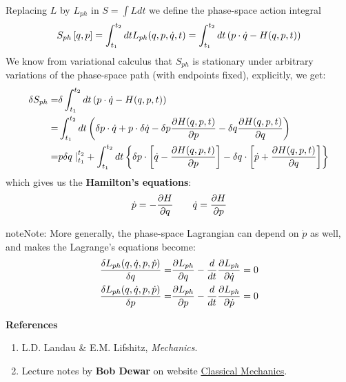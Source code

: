 \documentclass[letterpaper,10pt,english]{sphinxmanual}
\begin{document}
Replacing \(L\) by \(L_{ph}\) in \(S =
\int L dt\) we define the phase-space action integral
\begin{gather}
\begin{split}S_{ph}\left[q, p\right] = \int_{t_1}^{t_2}dt L_{ph}(q,p,\dot{q},t)=\int_{t_1}^{t_2}dt \left(p\cdot\dot{q}-H(q,p,t)\right)\end{split}\notag
\end{gather}
We know from variational calculus that \(S_{ph}\) is stationary under arbitrary
variations of the phase-space path (with endpoints fixed), explicitly, we get:
\begin{gather}
\begin{split}\delta S_{ph} =&\delta\int_{t_1}^{t_2}dt \left(p\cdot\dot{q}-H(q,p,t)\right) \\
=&\int_{t_1}^{t_2}dt \left(\delta p\cdot\dot{q}+p\cdot\delta\dot{q}-\delta p \frac{\partial H(q,p,t)}{\partial p}-\delta q \frac{\partial H(q,p,t)}{\partial q}\right) \\
=&p\delta q\left. \right |_{t_1}^{t_2}+\int_{t_1}^{t_2}dt \left\{\delta p\cdot\left[\dot{q}-\frac{\partial H(q,p,t)}{\partial p}\right]-\delta q\cdot\left[\dot{p}+ \frac{\partial H(q,p,t)}{\partial q}\right]\right\}\end{split}\notag
\end{gather}
which gives us the \textbf{Hamilton's equations}:
\begin{gather}
\begin{split}\dot{p}=-\frac{\partial H}{\partial q} \qquad \dot{q}=\frac{\partial H}{\partial p}\end{split}\notag
\end{gather}
\begin{notice}{note}{Note:}
More generally, the phase-space Lagrangian can depend on \(\dot{p}\) as well, and makes the Lagrange's equations become:
\begin{gather}
\begin{split}\frac{\delta L_{ph}(q,\dot{q},p,\dot{p})}{\delta q}=&\frac{\partial L_{ph}}{\partial q}-\frac{d}{dt}\frac{\partial L_{ph}}{\partial \dot{q}}=0 \\
\frac{\delta L_{ph}(q,\dot{q},p,\dot{p})}{\delta p}=&\frac{\partial L_{ph}}{\partial p}-\frac{d}{dt}\frac{\partial L_{ph}}{\partial \dot{p}}=0\end{split}\notag
\end{gather}\end{notice}

\textbf{References}
\begin{enumerate}
\item {}
L.D. Landau \& E.M. Lifshitz, \emph{Mechanics}.

\item {}
Lecture notes by \textbf{Bob Dewar} on website \href{http://people.physics.anu.edu.au/~rld105/C01\_ClassMech/}{Classical Mechanics}.

\end{enumerate}
\end{document}
